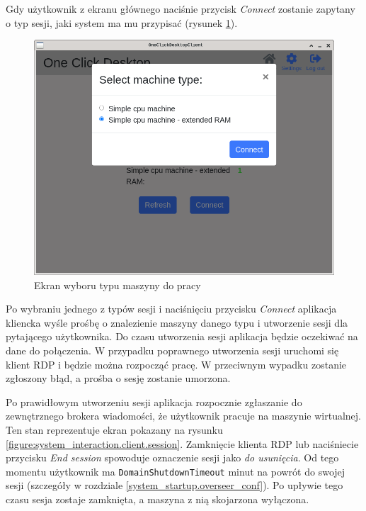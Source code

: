 \documentclass[../opis-rozwiazania.tex]{subfiles}
\begin{document}
Gdy użytkownik z ekranu głównego naciśnie przycisk \textit{Connect} zostanie zapytany o typ sesji, jaki system ma mu przypisać (rysunek \ref{figure:system_interaction.client.select}).

\begin{figure}[h!]
  \centering
  \includegraphics[width=\textwidth]{resources/client_select.png}
  \caption{Ekran wyboru typu maszyny do pracy}
  \label{figure:system_interaction.client.select}
\end{figure}

Po wybraniu jednego z typów sesji i naciśnięciu przycisku \textit{Connect} aplikacja kliencka wyśle prośbę o znalezienie maszyny danego typu i utworzenie sesji dla pytającego użytkownika.
Do czasu utworzenia sesji aplikacja będzie oczekiwać na dane do połączenia.
W przypadku poprawnego utworzenia sesji uruchomi się klient RDP i będzie można rozpocząć pracę.
W przeciwnym wypadku zostanie zgłoszony błąd, a prośba o sesję zostanie umorzona.

Po prawidłowym utworzeniu sesji aplikacja rozpocznie zgłaszanie do zewnętrznego brokera wiadomości, że użytkownik pracuje na maszynie wirtualnej.
Ten stan reprezentuje ekran pokazany na rysunku \ref{figure:system_interaction.client.session}.
Zamknięcie klienta RDP lub naciśniecie przycisku \textit{End session} spowoduje oznaczenie sesji jako \textit{do usunięcia}.
Od tego momentu użytkownik ma \texttt{DomainShutdownTimeout} minut na powrót do swojej sesji (szczegóły w rozdziale \ref{system_startup.overseer_conf}).
Po upływie tego czasu sesja zostaje zamknięta, a maszyna z nią skojarzona wyłączona.
\end{document}
